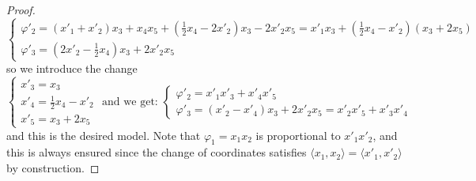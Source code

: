 \documentclass[10pt,reqno]{amsart}
\newcommand{\la}{\langle}
\newcommand{\ra}{\rangle}
\newcommand{\f}{\varphi}
\theoremstyle{definition}
\begin{document}
\begin{proof}
\[\begin{cases}
\f'_2= (x'_1+x'_2)x_3+x_4x_5+ (\frac12 x_4-2x'_2)x_3-2 x'_2x_5 =x'_1x_3 + (\frac12 x_4-x'_2)(x_3+2x_5)\\
\f'_3=(2x'_2-\frac12 x_4) x_3 + 2 x'_2x_5
\end{cases}
\]
so we introduce the change
\[
\begin{cases}
    x'_3=x_3 \\
    x'_4=\tfrac12 x_4 -x'_2 \\
    x'_5=x_3+2x_5
\end{cases} \text{ and we get:  }
\begin{cases}
\f'_2 =x'_1x'_3 + x'_4x'_5\\
\f'_3=(x'_2-x'_4) x_3 + 2 x'_2x_5=x'_2 x'_5 + x'_3x'_4
\end{cases}
\]
and this is the desired model. Note that $\f_1=x_1x_2$ is proportional to $x'_1x'_2$, and this is always ensured since the change of coordinates satisfies $\la x_1, x_2 \ra=\la x'_1, x'_2 \ra$ by construction.



\medskip


\end{proof}
\end{document}
